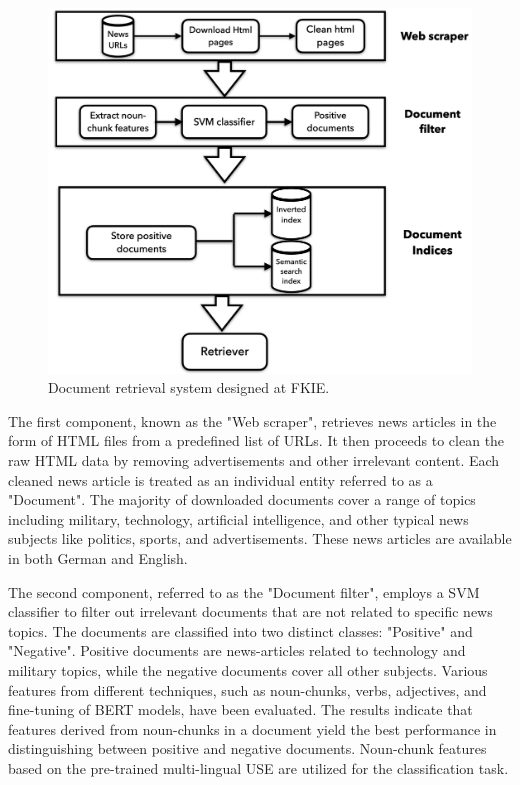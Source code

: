 \begin{figure}[h]
	\centering
	\includegraphics[width=.9\textwidth]{images/thesis_images/background.png}
	\caption[Existing work developed at FKIE.]{Document retrieval system designed at FKIE. \label{fig:background_image}}
\end{figure}

The first component, known as the "Web scraper", retrieves news articles in the form of HTML files from a predefined list of URLs. It then proceeds to clean the raw HTML data by removing advertisements and other irrelevant content. Each cleaned news article is treated as an individual entity referred to as a "Document". The majority of downloaded documents cover a range of topics including military, technology, artificial intelligence, and other typical news subjects like politics, sports, and advertisements. These news articles are available in both German and English.

The second component, referred to as the "Document filter", employs a \ac{SVM} classifier to filter out irrelevant documents that are not related to specific news topics. The documents are classified into two distinct classes: "Positive" and "Negative". Positive documents are news-articles related to technology and military topics, while the negative documents cover all other subjects. Various features from different techniques, such as noun-chunks, verbs, adjectives, and fine-tuning of \ac{BERT} models, have been evaluated. The results indicate that features derived from noun-chunks in a document yield the best performance in distinguishing between positive and negative documents. Noun-chunk features based on the pre-trained multi-lingual \ac{USE} are utilized for the classification task.

